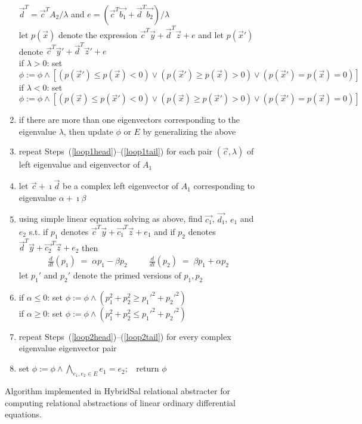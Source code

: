 \documentclass{llncs}
\begin{document}
\begin{figure}[htb!]
\begin{enumerate}
  $\vec{d}^T   = {\vec{c}^T A_2}/{\lambda}$ and
  $e  = (\vec{c}^T \vec{b_1} + \vec{d}^T \vec{b_2})/{\lambda}$
 \\
 let $p(\vec{x})$ denote the expression
 $\vec{c}^T\vec{y}+\vec{d}^T\vec{z}+e$
 and let $p(\vec{x}')$ denote
 $\vec{c}^T\vec{y}'+\vec{d}^T\vec{z}'+e$
 \\
 if $\lambda > 0$: set $\phi := 
  \phi \wedge [(p(\vec{x}') \leq p(\vec{x}) < 0)\vee
  (p(\vec{x}') \geq p(\vec{x}) > 0)\vee
  (p(\vec{x}') = p(\vec{x}) = 0)]
 $
 \\
 if $\lambda < 0$: set $\phi := 
  \phi \wedge 
 [(p(\vec{x}) \leq p(\vec{x}') < 0)\vee
  (p(\vec{x}) \geq p(\vec{x}') > 0)\vee
  (p(\vec{x}') = p(\vec{x}) = 0)]$
\item\label{loop1tail}
 if there are more than one eigenvectors corresponding to the eigenvalue $\lambda$, then update $\phi$ or $E$ by generalizing the above
\item
 repeat Steps~(\ref{loop1head})--(\ref{loop1tail}) 
 for each pair $(\vec{c},\lambda)$
 of left eigenvalue and eigenvector of $A_1$ 
\item\label{loop2head}
 let $\vec{c}+\imath\vec{d}$ be a complex left eigenvector
 of $A_1$ corresponding to eigenvalue $\alpha+\imath\beta$
\item
 using simple linear equation solving
 as above, find 
 $\vec{c_1}$, $\vec{d_1}$, $e_1$ and $e_2$ s.t.
 if $p_1$ denotes $\vec{c}^T\vec{y}+\vec{c_1}^T\vec{z}+e_1$
 and
 if $p_2$ denotes $\vec{d}^T\vec{y}+\vec{c_2}^T\vec{z}+e_2$
 then
 \begin{eqnarray*}
 \frac{d}{dt}(p_1)
  \; = \;
  \alpha p_1 - \beta p_2
 & \quad &
 \frac{d}{dt}(p_2)
  \; = \;
  \beta p_1 + \alpha p_2
  \end{eqnarray*}
 let $p_1'$ and $p_2'$ denote the primed versions of $p_1,p_2$
\item\label{loop2tail}
 if $\alpha \leq 0$: set $\phi := \phi\wedge( p_1^2+p_2^2 \geq
 {p_1'}^2 + {p_2'}^2)$
 \\
 if $\alpha \geq 0$: set $\phi := \phi\wedge( p_1^2+p_2^2 \leq
 {p_1'}^2 + {p_2'}^2)$
\item
 repeat Steps~(\ref{loop2head})--(\ref{loop2tail}) for every
 complex eigenvalue eigenvector pair
\item
 set $\phi := \phi\wedge
 \bigwedge_{e_1,e_2\in E} e_1 = e_2;\;\;$ return $\phi$
\end{enumerate}
\caption{Algorithm implemented in HybridSal relational abstracter
for computing relational abstractions of linear ordinary differential
equations.}\label{fig:algo}
\end{figure}
\end{document}
